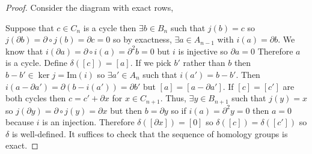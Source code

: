 \documentclass[12pt]{extarticle}
\renewcommand{\Im}[1]{\mathrm{Im}(#1)}
\theoremstyle{definition}
\begin{document}
\begin{proof}
Consider the diagram with exact rows,
\begin{center}
\end{center} 
Suppose that $c \in C_n$ is a cycle then $\exists b \in B_n$ such that $j(b) = c$ so $j(\partial b) = \partial \circ j(b) = \partial c = 0$ so by exactness, $\exists a \in A_{n-1}$ with $i(a) = \partial b$. We know that $i(\partial a) = \partial \circ i(a) = \partial^2 b = 0$ but $i$ is injective so $\partial a = 0$  Therefore $a$ is a cycle. Define $\delta([c]) = [a]$. If we pick $b'$ rather than $b$ then $b - b' \in \ker{j} = \Im{i}$ so $\exists a' \in A_n$ such that $i(a') = b - b'$. Then $i(a - \partial a') = \partial(b - i(a')) = \partial b'$ but $[a] = [a - \partial a']$. If $[c] = [c']$ are both cycles then $c = c' + \partial x$ for $x \in C_{n+1}$. Thus, $\exists y \in B_{n+1}$ such that $j(y) = x$ so $j(\partial y) = \partial \circ j(y) = \partial x$ but then $b = \partial y$ so if $i(a) = \partial^2 y = 0$ then $a = 0$ because $i$ is an injection. Therefore $\delta([\partial x]) = [0]$ so $\delta([c]) = \delta([c'])$ so $\delta$ is well-defined. It suffices to check that the sequence of homology groups is exact.
\end{proof}
\end{document}
